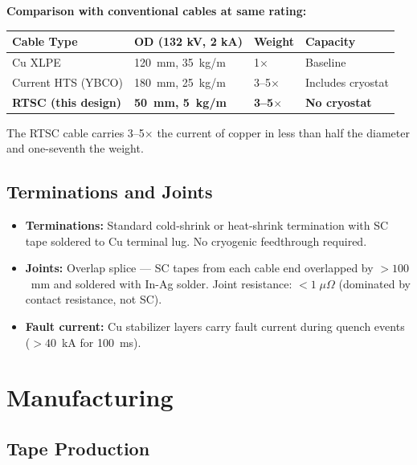 \documentclass[11pt, a4paper]{article}
\begin{document}
\textbf{Comparison with conventional cables at same rating:}

\begin{center}
\begin{tabular}{@{}llll@{}}
\toprule
\textbf{Cable Type} & \textbf{OD (132 kV, 2 kA)} & \textbf{Weight} &
  \textbf{Capacity} \\
\midrule
Cu XLPE & 120~mm, 35~kg/m & 1$\times$ & Baseline \\
Current HTS (YBCO) & 180~mm, 25~kg/m & 3--5$\times$ &
  Includes cryostat \\
\textbf{RTSC (this design)} & \textbf{50~mm, 5~kg/m} &
  \textbf{3--5$\times$} & \textbf{No cryostat} \\
\bottomrule
\end{tabular}
\end{center}

The RTSC cable carries 3--5$\times$ the current of copper in less
than half the diameter and one-seventh the weight.

\subsection{Terminations and Joints}

\begin{itemize}[nosep]
  \item \textbf{Terminations:} Standard cold-shrink or heat-shrink
        termination with SC tape soldered to Cu terminal lug.
        No cryogenic feedthrough required.
  \item \textbf{Joints:} Overlap splice --- SC tapes from each cable
        end overlapped by $> 100$~mm and soldered with In-Ag solder.
        Joint resistance: $< 1\;\mu\Omega$ (dominated by contact
        resistance, not SC).
  \item \textbf{Fault current:} Cu stabilizer layers carry fault
        current during quench events ($> 40$~kA for 100~ms).
\end{itemize}

\section{Manufacturing}
\label{sec:manufacturing}

\subsection{Tape Production}
\end{document}
